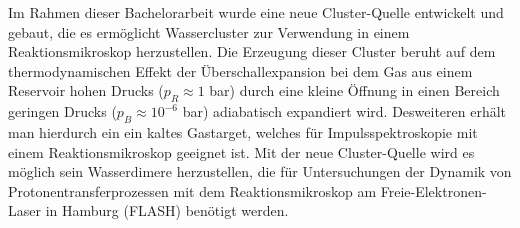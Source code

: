 \begin{center}\large{}\end{center}
%
Im Rahmen dieser Bachelorarbeit wurde eine neue Cluster-Quelle entwickelt und gebaut, die es ermöglicht Wassercluster zur Verwendung in einem Reaktionsmikroskop herzustellen. Die Erzeugung dieser Cluster beruht auf dem thermodynamischen Effekt der Überschallexpansion bei dem Gas aus einem Reservoir hohen Drucks ($p_R \approx 1 $ bar) durch eine kleine Öffnung in einen Bereich geringen Drucks ($p_B \approx 10^{-6}$ bar) adiabatisch expandiert wird. Desweiteren erhält man hierdurch ein ein kaltes Gastarget, welches für Impulsspektroskopie mit einem Reaktionsmikroskop geeignet ist. Mit der neue Cluster-Quelle wird es möglich sein Wasserdimere herzustellen, die für Untersuchungen der Dynamik von Protonentransferprozessen mit dem Reaktionsmikroskop am Freie-Elektronen-Laser in Hamburg (FLASH) benötigt werden. 

\clearpage
~ \clearpage